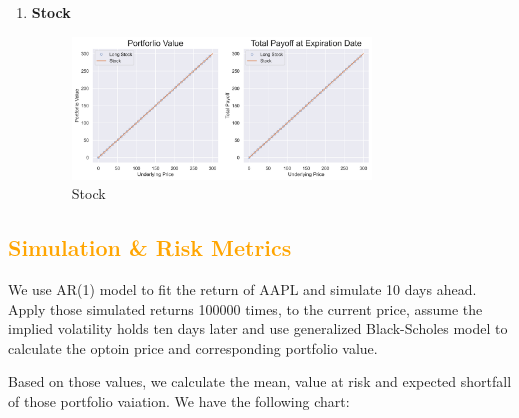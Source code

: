\documentclass[11pt,en]{elegantpaper}
\begin{document}
\begin{enumerate}
    \newpage

    \item \textbf{Stock}
    \begin{figure}[htbp] 
        \centering 
        \includegraphics[width=0.75\textwidth]{./image/image_3/optionStrategy/Stock.png} 
        \caption{Stock}
    \end{figure}

\end{enumerate}

\subsection*{\textcolor{orange}{Simulation \& Risk Metrics}}

We use AR(1) model to fit the return of AAPL and simulate 10 days ahead. Apply those simulated returns 100000 times, to the current price, assume the implied volatility holds ten days later and use generalized Black-Scholes model to calculate the optoin price and corresponding portfolio value.

Based on those values, we calculate the mean, value at risk and expected shortfall of those portfolio vaiation. We have the following chart:
\end{document}
